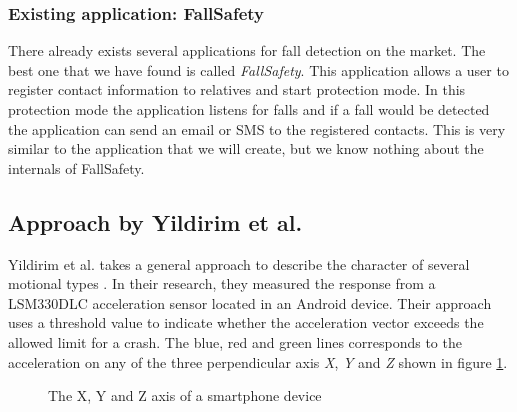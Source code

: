 \documentclass[12pt, a4paper, onecolumn]{article}
\begin{document}
	\subsubsection{Existing application: FallSafety}
	
	There already exists several applications for fall detection on the market. The best one that we have found is called \textit{FallSafety}. This application allows a user to register contact information to relatives and start protection mode. In this protection mode the application listens for falls and if a fall would be detected the application can send an email or SMS to the registered contacts. This is very similar to the application that we will create, but we know nothing about the internals of FallSafety.
	
	\subsection{Approach by Yildirim et al.}
	Yildirim et al. takes a general approach to describe the character of several motional types \cite{int_journ}. In their research, they measured the response from a LSM330DLC acceleration sensor located in an Android device. Their approach uses a threshold value to indicate whether the acceleration vector exceeds the allowed limit for a crash. The blue, red and green lines corresponds to the acceleration on any of the three perpendicular axis \textit{X}, \textit{Y} and \textit{Z} shown in figure \ref{fig:XYZ-Axis}.
	
	\begin{figure}[H]
		\centering
		\caption{The X, Y and Z axis of a smartphone device}%
		\label{fig:XYZ-Axis}%
	\end{figure}
	
\end{document}
